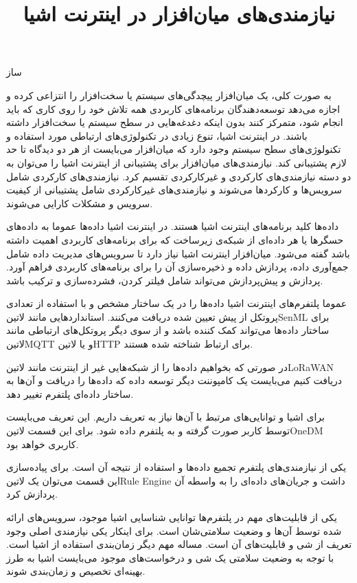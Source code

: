 \documentclass[]{./reports}
\title{نیازمندی‌های میان‌افزار در اینترنت اشیا}
\begin{document}
‌ساز

به صورت کلی، یک میان‌افزار پیچدگی‌های سیستم یا سخت‌افزار را انتزاعی کرده و اجازه می‌دهد
توسعه‌دهندگان برنامه‌های کاربردی همه تلاش خود را روی کاری که باید انجام شود، متمرکز کنند بدون
اینکه دغدغه‌هایی در سطح سیستم یا سخت‌افزار داشته باشند.
در اینترنت اشیا، تنوع زیادی در تکنولوژی‌های ارتباطی مورد استفاده و تکنولوژی‌های سطح سیستم وجود دارد که
میان‌افزار می‌بایست از هر دو دیدگاه تا حد لازم پشتیبانی کند.
نیازمندی‌های میان‌افزار برای پشتیبانی از اینترنت اشیا را می‌توان به دو دسته نیازمندی‌های کارکردی و غیرکارکردی تقسیم کرد.
نیازمندی‌های کارکردی شامل سرویس‌ها و کارکردها می‌شوند و نیازمندی‌های غیرکارکردی شامل پشتیبانی از کیفیت سرویس
و مشکلات کارایی می‌شوند.


داده‌ها کلید برنامه‌های اینترنت اشیا هستند. در اینترنت اشیا داده‌ها عموما به داده‌های حسگرها
یا هر داده‌ای از شبکه‌ی زیرساخت که برای برنامه‌های کاربردی اهمیت داشته باشد گفته می‌شود.
میان‌افزار اینترنت اشیا نیاز دارد تا سرویس‌های مدیریت داده شامل جمع‌آوری داده، پردازش داده و ذخیره‌سازی
آن را برای برنامه‌های کاربردی فراهم آورد.
پردازش و پیش‌پردازش می‌تواند شامل فیلتر کردن، فشرده‌سازی و ترکیب باشد.


عموما پلتفرم‌های اینترنت اشیا داده‌ها را در یک ساختار مشخص
و با استفاده از تعدادی پروتکل از پیش تعیین شده دریافت می‌کنند.
استانداردهایی مانند ‌لاتین{SenML} برای ساختار داده‌ها می‌تواند
کمک کننده باشد و از سوی دیگر پروتکل‌های ارتباطی مانند ‌لاتین{MQTT}
و یا ‌لاتین{HTTP} برای ارتباط شناخته شده هستند.

در صورتی که بخواهیم داده‌ها را از شبکه‌هایی غیر از اینترنت مانند ‌لاتین{LoRaWAN}
دریافت کنیم می‌بایست یک کامپوننت دیگر توسعه داده که داده‌ها را دریافت و آن‌ها به ساختار
داده‌ای پلتفرم تغییر دهد.


برای اشیا و توانایی‌های مرتبط با آن‌ها نیاز به تعریف داریم. این تعریف می‌بایست توسط کاربر صورت
گرفته و به پلتفرم داده شود. برای این قسمت ‌لاتین{OneDM} کاربری خواهد بود.


یکی از نیازمندی‌های پلتفرم تجمیع داده‌ها و استفاده از نتیجه آن است.
برای پیاده‌سازی این قسمت می‌توان یک ‌لاتین{Rule Engine} داشت و جریان‌های داده‌ای
را به واسطه آن پردازش کرد.


یکی از قابلیت‌های مهم در پلتفرم‌ها توانایی شناسایی اشیا موجود، سرویس‌های ارائه شده توسط آن‌ها و وضعیت سلامتی‌شان است.
برای اینکار یکی نیازمندی اصلی وجود تعریف از شی و قابلیت‌های آن است.
مساله مهم دیگر زمان‌بندی استفاده از اشیا است. با توجه به وضعیت سلامتی یک شی و درخواست‌های موجود می‌بایست اشیا
به طرز بهینه‌ای تخصیص و زمان‌بندی شوند.
\end{document}
